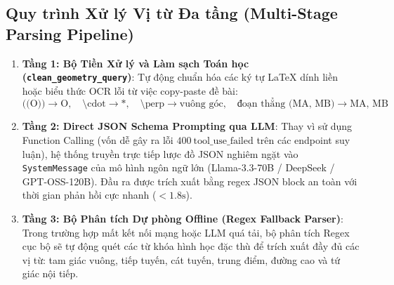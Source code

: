 \subsection{Quy trình Xử lý Vị từ Đa tầng (Multi-Stage Parsing Pipeline)}
\begin{enumerate}
    \item \textbf{Tầng 1: Bộ Tiền Xử lý và Làm sạch Toán học (\texttt{clean\_geometry\_query})}:
    Tự động chuẩn hóa các ký tự LaTeX dính liền hoặc biểu thức OCR lỗi từ việc copy-paste đề bài:
    $$\text{((O))} \longrightarrow \text{O}, \quad \text{\textbackslash cdot} \longrightarrow *, \quad \text{\textbackslash perp} \longrightarrow \text{vuông góc}, \quad \text{đoạn thẳng (MA, MB)} \longrightarrow \text{MA, MB}$$
    
    \item \textbf{Tầng 2: Direct JSON Schema Prompting qua LLM}:
    Thay vì sử dụng Function Calling (vốn dễ gây ra lỗi $400\ \text{tool\_use\_failed}$ trên các endpoint suy luận), hệ thống truyền trực tiếp lược đồ JSON nghiêm ngặt vào \texttt{SystemMessage} của mô hình ngôn ngữ lớn (Llama-3.3-70B / DeepSeek / GPT-OSS-120B). Đầu ra được trích xuất bằng regex JSON block an toàn với thời gian phản hồi cực nhanh ($< 1.8\text{s}$).

    \item \textbf{Tầng 3: Bộ Phân tích Dự phòng Offline (Regex Fallback Parser)}:
    Trong trường hợp mất kết nối mạng hoặc LLM quá tải, bộ phân tích Regex cục bộ sẽ tự động quét các từ khóa hình học đặc thù để trích xuất đầy đủ các vị từ: tam giác vuông, tiếp tuyến, cát tuyến, trung điểm, đường cao và tứ giác nội tiếp.
\end{enumerate}

